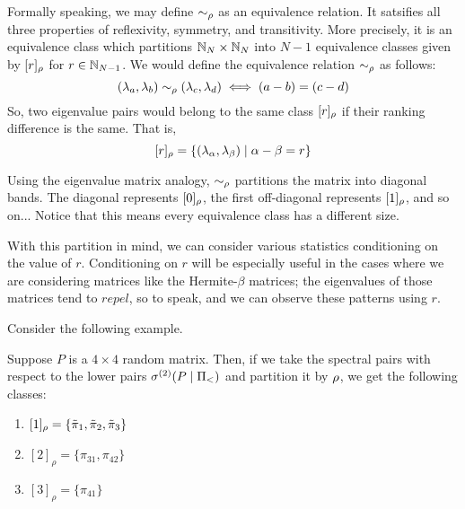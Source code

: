 \begin{remark}
Formally speaking, we may define $\sim_{\rho}$ as an equivalence relation. It satsifies all three properties of reflexivity, symmetry, and transitivity. More precisely, it is an equivalence class which partitions $\mathbb{N}_N \times \mathbb{N}_N$ into $N - 1$ equivalence classes given by $[r]_{\rho}$ for $r \in \mathbb{N}_{N-1}$. We would define the equivalence relation $\sim_{\rho}$ as follows:
$$(\lambda_a,\lambda_b) \sim_{\rho} (\lambda_c,\lambda_d) \iff (a -b) = (c-d)$$
So, two eigenvalue pairs would belong to the same class $[r]_{\rho}$ if their ranking difference is the same. That is,
$$[r]_{\rho} = \{(\lambda_\alpha, \lambda_\beta) \mid \alpha - \beta = r\}$$
\end{remark}

\begin{remark}
Using the eigenvalue matrix analogy, $\sim_{\rho}$ partitions the matrix into diagonal bands. The diagonal represents $[0]_{\rho}$, the first off-diagonal represents $[1]_{\rho}$, and so on... Notice that this means every equivalence class has a different size.
\end{remark}

With this partition in mind, we can consider various statistics conditioning on the value of $r$. Conditioning on $r$ will be especially useful in the cases where we are considering matrices like the Hermite-$\beta$ matrices; the eigenvalues of those matrices tend to $\textit{repel}$, so to speak, and we can observe these patterns using $r$. \newline

\noindent Consider the following example.

\begin{example}
Suppose $P$ is a $4 \times 4$ random matrix. Then, if we take the spectral pairs with respect to the lower pairs ${\sigma^{(2)}}(P \mid \Pi_<)$ and partition it by ${\rho}$, we get the following classes:
\begin{enumerate}
  \item $[1]_\rho = \{{\tilde{\pi}}_1, {\tilde{\pi}}_2, {\tilde{\pi}}_3\}$
  \item $[2]_\rho = \{\pi_{31}, \pi_{42}\}$
  \item $[3]_\rho = \{\pi_{41}\}$
\end{enumerate}
\end{example}

